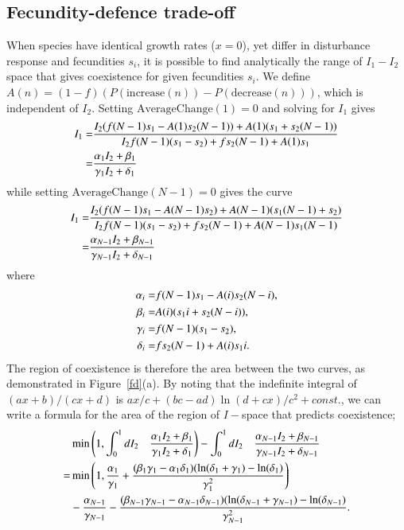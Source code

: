 \subsection{Fecundity-defence trade-off}
When species have identical growth rates ($x=0$), yet differ in disturbance response and fecundities $s_i$, it is possible to find analytically the range of $I_1 - I_2$ space that gives coexistence for given fecundities $s_i$. We define $A(n)=(1-f)(P(\text{increase}(n))-P(\text{decrease}(n)))$, which is independent of $I_2$. Setting $\text{AverageChange}(1)=0$ and solving for $I_1$ gives
\begin{align}
\label{fdac1sol}
I_1=&\frac{I_2(f(N-1)s_1-A(1)s_2(N-1)) +A(1)(s_1+s_2(N-1))}{I_2f(N-1)(s_1-s_2) +fs_2(N-1) +A(1)s_1}\notag \\
=&\frac{\alpha_1 I_2 +\beta_1}{\gamma_1 I_2+\delta_1}
\end{align}
while setting $\text{AverageChange}(N-1)=0$ gives the curve
\begin{align}
\label{fdacnsol}
I_1=&\frac{I_2(f(N-1)s_1-A(N-1)s_2) +A(N-1)(s_1(N-1)+s_2)}{I_2f(N-1)(s_1-s_2) +fs_2(N-1) +A(N-1)s_1(N-1)}\notag \\
=&\frac{\alpha_{N-1} I_2 +\beta_{N-1}}{\gamma_{N-1} I_2+\delta_{N-1}}
\end{align}
where
\begin{align}
\alpha_i =& f(N-1)s_1 - A(i) s_2 (N-i), \notag \\
\beta_i =& A(i) (s_1 i + s_2(N-i)), \notag \\
\gamma_i =& f(N-1)(s_1-s_2), \notag \\
\delta_i =& fs_2(N-1) + A(i)s_1 i. \notag
\end{align}
The region of coexistence is therefore the area between the two curves, as demonstrated in Figure~\ref{fd}(a). By noting that the indefinite integral of $(a x +b)/(c x +d)$ is $ax/c+(bc-ad)\ln(d+cx)/c^2 +const.$, we can write a formula for the area of the region of $I-$space that predicts coexistence;
\begin{align}
&\min \left(1, \int_0^1 dI_2 \quad \frac{\alpha_1 I_2 +\beta_1}{\gamma_1 I_2+\delta_1} \right) -  \int_0^1 dI_2\quad \frac{\alpha_{N-1} I_2 +\beta_{N-1}}{\gamma_{N-1} I_2+\delta_{N-1}}  \notag \\
=&\min\left(1,\frac{\alpha_1}{\gamma_1}+\frac{(\beta_1 \gamma_1 - \alpha_1 \delta_1)(\ln(\delta_1 +\gamma_1)-\ln(\delta_1)}{\gamma_1^2}\right) \\
&-\frac{\alpha_{N-1}}{\gamma_{N-1}}-\frac{(\beta_{N-1} \gamma_{N-1} - \alpha_{N-1} \delta_{N-1})(\ln(\delta_{N-1} +\gamma_{N-1})-\ln(\delta_{N-1})}{\gamma_{N-1}^2}. \notag
\end{align}
